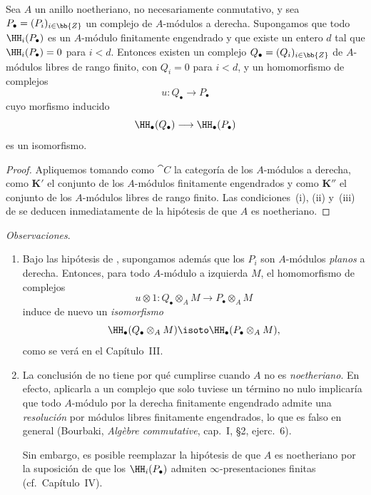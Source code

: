 \documentclass[oneside]{amsart}
\let\EGAOriginalLabel\label
\renewcommand{\label}[1]{\phantomsection\EGAOriginalLabel{#1}}
\begin{document}
\begin{corollary}[11.9.2]
\label{0.11.9.2}
Sea $A$ un anillo noetheriano, no necesariamente conmutativo, y sea
$P_\bullet=(P_i)_{i\in\bb{Z}}$ un complejo de $A$-módulos a derecha.
Supongamos que todo $\HH_i(P_\bullet)$ es un $A$-módulo finitamente
engendrado y que existe un entero $d$ tal que
$\HH_i(P_\bullet)=0$ para $i<d$.
Entonces existen un complejo $Q_\bullet=(Q_i)_{i\in\bb{Z}}$ de
$A$-módulos libres de rango finito, con $Q_i=0$ para $i<d$, y un homomorfismo
de complejos
\[
  u:Q_\bullet\longrightarrow P_\bullet
\]
cuyo morfismo inducido
\[
  \HH_\bullet(Q_\bullet)\longrightarrow\HH_\bullet(P_\bullet)
\]
es un isomorfismo.
\end{corollary}

\begin{proof}
Apliquemos  tomando como $\cat{C}$ la categoría de los
$A$-módulos a derecha, como $\boldsymbol K'$ el conjunto de los $A$-módulos finitamente engendrados y
como $\boldsymbol K''$ el conjunto de los $A$-módulos libres de rango finito.
Las condiciones~(i), (ii) y~(iii) de  se deducen inmediatamente
de la hipótesis de que $A$ es noetheriano.
\end{proof}

\begin{env}[11.9.3]
\label{0.11.9.3}
\emph{Observaciones}.
\begin{enumerate}
  \item[{\rm(i)}]
  Bajo las hipótesis de , supongamos además que los
  $P_i$ son $A$-módulos \emph{planos} a derecha.
  Entonces, para todo $A$-módulo a izquierda $M$, el homomorfismo de complejos
  \[
    u\otimes 1:
    Q_\bullet\otimes_A M
    \longrightarrow
    P_\bullet\otimes_A M
  \]
  induce de nuevo un \emph{isomorfismo}
  \[
    \HH_\bullet(Q_\bullet\otimes_A M)
    \isoto
    \HH_\bullet(P_\bullet\otimes_A M),
  \]
  como se verá en el Capítulo~III.

  \item[{\rm(ii)}]
  La conclusión de  no tiene por qué cumplirse cuando $A$ no es
  \emph{noetheriano}.
  En efecto, aplicarla a un complejo que solo tuviese un término no nulo
  implicaría que todo $A$-módulo por la derecha finitamente engendrado admite una \emph{resolución} por
  módulos libres finitamente engendrados, lo que es falso en general
(Bourbaki, \emph{Alg\`ebre commutative}, cap.~I, \S2, ejerc.~6).

  Sin embargo, es posible reemplazar la hipótesis de que $A$ es
  noetheriano por la suposición de que los $\HH_i(P_\bullet)$ admiten
  $\infty$-presentaciones finitas (cf.\ Capítulo~IV).
\end{enumerate}
\end{env}
\end{document}
